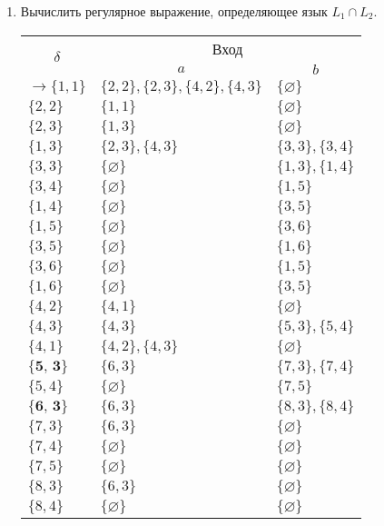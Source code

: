 		
	\begin{enumerate}[label=(\roman{*})]
	\item Вычислить регулярное выражение, определяющее язык $L_1 \cap  L_2$.
	
	\begin{center}
		\begin{tabular}{lll}
			\toprule
			\multicolumn{1}{c}{\multirow{2}{*}{\Large $\delta$}}
			& \multicolumn{2}{c}{Вход} \\
			\cmidrule(rl){2-3}
			& \multicolumn{1}{c}{$a$}
			& \multicolumn{1}{c}{$b$}  \\
			\midrule
			$\to \{1, 1\}$       & $\{2, 2\}, \{2, 3\}, \{4, 2\}, \{4, 3\}$     		 & $\{\varnothing\}$      \\
			$\{2, 2\}$       & $\{1, 1\}$    			 & $\{\varnothing\}$      \\
			$\{2, 3\}$       & $\{1, 3\}$    			 & $\{\varnothing\}$      \\
			$\{1, 3\}$       & $\{2, 3\}, \{4, 3\}$     &  $\{3, 3\}, \{3, 4\}$  \\
			$\{3, 3\}$       & $\{\varnothing\}$     &  $\{1, 3\}, \{1, 4\}$  \\
			$\{3, 4\}$       & $\{\varnothing\}$     &  $\{1, 5\}$  \\
			$\{1, 4\}$       & $\{\varnothing\}$     &  $\{3, 5\}$  \\
			$\{1, 5\}$       & $\{\varnothing\}$     &  $\{3, 6\}$  \\
			$\{3, 5\}$       & $\{\varnothing\}$     &  $\{1, 6\}$  \\
			$\{3, 6\}$       & $\{\varnothing\}$     &  $\{1, 5\}$  \\
			$\{1, 6\}$       & $\{\varnothing\}$     &  $\{3, 5\}$  \\
			$\{4, 2\}$       & $\{4, 1\}$    			 & $\{\varnothing\}$      \\
			$\{4, 3\}$       & $\{4, 3\}$    			 & $\{5, 3\}, \{5, 4\}$      \\
			$\{4, 1\}$       & $\{4, 2\}, \{4, 3\}$    			 & $\{\varnothing\}$      \\
			$\textbf{\{5, 3\}}$       & $\{6, 3\}$    			 & $\{7, 3\}, \{7, 4\}$      \\
			$\{5, 4\}$       & $\{\varnothing\}$    			 & $\{7, 5\}$      \\
			$\textbf{\{6, 3\}}$       & $\{6, 3\}$    			 & $\{8, 3\}, \{8, 4\}$      \\
			$\{7, 3\}$       & $\{6, 3\}$    			 & $\{\varnothing\}$      \\
			$\{7, 4\}$       & $\{\varnothing\}$    			 & $\{\varnothing\}$      \\
			$\{7, 5\}$       & $\{\varnothing\}$    			 & $\{\varnothing\}$      \\
			$\{8, 3\}$       & $\{6, 3\}$    			 & $\{\varnothing\}$      \\
			$\{8, 4\}$       & $\{\varnothing\}$    			 & $\{\varnothing\}$      \\
			\bottomrule
		\end{tabular}
	\end{center}
	

\end{enumerate}
